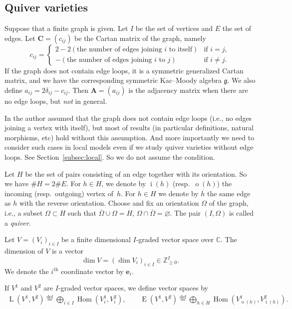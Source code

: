 \documentclass[pdftex]{sigma}
\theoremstyle{definition}
\numberwithin{equation}{section}
\newcommand{\subsecref}[1]{Section~\ref{#1}}
\newcommand{\defeq}{\overset{\operatorname{\scriptstyle def}}{=}}
\newcommand{\C}{{\mathbb C}}
\newcommand{\g}{{\mathfrak g}}
\newcommand{\Hom}{\operatorname{Hom}}
\newcommand{\vin}[1]{\operatorname{i}(#1)} %
\newcommand{\vout}[1]{\operatorname{o}(#1)} %
\newcommand{\bC}{{\mathbf C}} %
\newcommand{\bA}{{\mathbf A}} %
\newcommand{\be}{{\mathbf e}}
\newcommand{\HomE}{\operatorname{E}}
\newcommand{\HomL}{\operatorname{L}}
\begin{document}
\subsection{Quiver varieties}\label{subsec:quiver}

Suppose that a f\/inite graph is given. Let $I$ be the set of vertices
and $E$ the set of edges.
%
Let $\bC = (c_{ij})$ be the Cartan matrix of the graph, namely
\begin{equation*}
   c_{ij} =
   \begin{cases}
     2 - 2 (\text{the number of edges joining $i$ to itself})
     & \text{if $i=j$},
\\
     - (\text{the number of edges joining $i$ to $j$})
     & \text{if $i\neq j$}.
   \end{cases}
\end{equation*}
If the graph does not contain edge loops, it is a symmetric
generalized Cartan matrix, and we have the corresponding symmetric
Kac--Moody algebra $\g$. We also def\/ine
\(
   a_{ij} = 2\delta_{ij} - c_{ij}.
\)
Then $\bA = (a_{ij})$ is the adjacency matrix when there are no edge
loops, but {\it not} in general.

In \cite{Na-quiver,Na-alg} the author assumed that the graph does not
contain edge loops (i.e., no edges joining a vertex with itself), but
most of results (in particular def\/initions, natural morphisms, etc)
hold without this assumption. And more importantly we need to consider
such cases in local models even if we study quiver varieties without
edge loops. See \subsecref{subsec:local}. So we do not assume the
condition.

Let $H$ be the set of pairs consisting of an edge together with its
orientation. So we have $\# H = 2\# E$.
%
For $h\in H$, we denote by $\vin{h}$ (resp.\ $\vout{h}$) the incoming
(resp.\ outgoing) vertex of~$h$.  For $h\in H$ we denote by $\overline
h$ the same edge as $h$ with the reverse orientation.
%
Choose and f\/ix an orientation $\Omega$ of the graph,
i.e., a subset $\Omega\subset H$ such that
$\overline\Omega\cup\Omega = H$, $\Omega\cap\overline\Omega = \varnothing$.
%
The pair $(I,\Omega)$ is called a {\it quiver}.


Let $V = (V_i)_{i\in I}$ be a f\/inite dimensional $I$-graded vector
space over $\C$. The dimension of $V$ is a vector
\[
  \dim V = (\dim V_i)_{i\in I}\in \mathbb Z_{\ge 0}^I.
\]
We denote the $i^{\mathrm{th}}$ coordinate vector by $\be_i$.


If $V^1$ and $V^2$ are $I$-graded vector spaces, we def\/ine vector spaces by
\begin{gather*}
  \HomL(V^1, V^2) \defeq
  \bigoplus_{i\in I} \Hom(V^1_i, V^2_i), \qquad
  \HomE(V^1, V^2) \defeq
  \bigoplus_{h\in H} \Hom(V^1_{\vout{h}}, V^2_{\vin{h}})
  .
\end{gather*}
\end{document}
